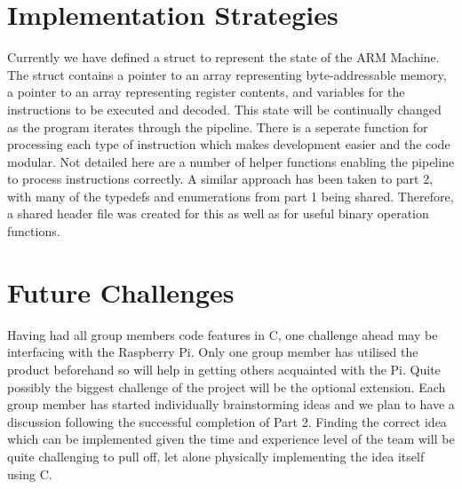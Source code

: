 \documentclass[11pt]{article}
\begin{document}
\newpage

\section{Implementation Strategies}

Currently we have defined a struct to represent the state of the ARM Machine. The struct contains a pointer to an array representing byte-addressable memory, a pointer to an array representing register contents, and variables for the instructions to be executed and decoded. This state will be continually changed as the program iterates through the pipeline. There is a seperate function for processing each type of instruction which makes development easier and the code modular. Not detailed here are a number of helper functions enabling the pipeline to process instructions correctly. A similar approach has been taken to part 2, with many of the typedefs and enumerations from part 1 being shared. Therefore, a shared header file was created for this as well as for useful binary operation functions.

\section{Future Challenges}

Having had all group members code features in C, one challenge ahead may be interfacing with the Raspberry Pi. Only one group member has utilised the product beforehand so will help in getting others acquainted with the Pi. Quite possibly the biggest challenge of the project will be the optional extension. Each group member has started individually brainstorming ideas and we plan to have a discussion following the successful completion of Part 2. Finding the correct idea which can be implemented given the time and experience level of the team will be quite challenging to pull off, let alone physically implementing the idea itself using C. 
\end{document}
